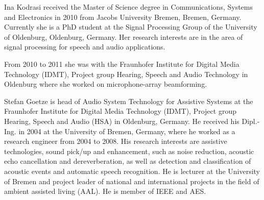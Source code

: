 \documentclass[10pt]{IEEEtran}
\begin{document}



\vspace{-1.1cm}
\begin{IEEEbiography}
{Ina Kodrasi} received the Master of Science degree in Communications, Systems and Electronics in 2010 from Jacobs University Bremen, Bremen, Germany.
Currently she is a PhD student at the Signal Processing Group of the University of Oldenburg, Oldenburg, Germany.
Her research interests are in the area of signal processing for speech and audio applications.

From 2010 to 2011 she was with the Fraunhofer Institute for Digital Media Technology (IDMT), Project group
Hearing, Speech and Audio Technology in Oldenburg where she worked on microphone-array beamforming.

\end{IEEEbiography}
\vspace{-1.2cm}

\begin{IEEEbiography}{Stefan Goetze}
is head of Audio System Technology for Assistive Systems at the Fraunhofer Institute for Digital Media Technology (IDMT), Project group Hearing, Speech and Audio (HSA) in Oldenburg, Germany.
He received his Dipl.-Ing. in 2004 at the University of Bremen, Germany, where he worked as a research engineer from 2004 to 2008.
His research interests are assistive technologies, sound pick/up and enhancement, such as noise reduction, acoustic echo cancellation and dereverberation, as well as detection and classification of acoustic events and automatic speech recognition.
He is lecturer at the University of Bremen and project leader of national and international projects in the field of ambient assisted living (AAL).
He is member of IEEE and AES.
\end{IEEEbiography}
\vspace{-1cm}
\end{document}
